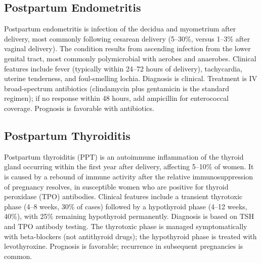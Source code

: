 \subsection{Postpartum Endometritis}
\label{sec:Postpartum Endometritis}
Postpartum endometritis is infection of the decidua and myometrium after delivery, most commonly following cesarean delivery (5--30\%, versus 1--3\% after vaginal delivery). The condition results from ascending infection from the lower genital tract, most commonly polymicrobial with aerobes and anaerobes. Clinical features include fever (typically within 24--72 hours of delivery), tachycardia, uterine tenderness, and foul-smelling lochia. Diagnosis is clinical. Treatment is IV broad-spectrum antibiotics (clindamycin plus gentamicin is the standard regimen); if no response within 48 hours, add ampicillin for enterococcal coverage. Prognosis is favorable with antibiotics.

\subsection{Postpartum Thyroiditis}
\label{sec:Postpartum Thyroiditis}
Postpartum thyroiditis (PPT) is an autoimmune inflammation of the thyroid gland occurring within the first year after delivery, affecting 5--10\% of women. It is caused by a rebound of immune activity after the relative immunosuppression of pregnancy resolves, in susceptible women who are positive for thyroid peroxidase (TPO) antibodies. Clinical features include a transient thyrotoxic phase (4--8 weeks, 30\% of cases) followed by a hypothyroid phase (4--12 weeks, 40\%), with 25\% remaining hypothyroid permanently. Diagnosis is based on TSH and TPO antibody testing. The thyrotoxic phase is managed symptomatically with beta-blockers (not antithyroid drugs); the hypothyroid phase is treated with levothyroxine. Prognosis is favorable; recurrence in subsequent pregnancies is common.

